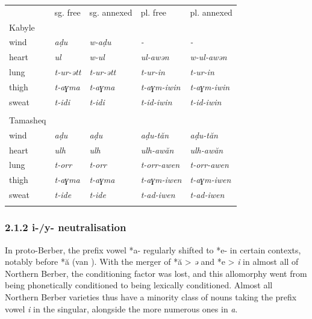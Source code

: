 \documentclass[output=paper]{langscibook}
\begin{document}
\begin{tabularx}{\textwidth}{XXXXX}
 & sg. free & sg. annexed & pl. free & pl. annexed\\
\lsptoprule
Kabyle \citep{Dallet1982} &  &  &  & \\
wind & \textit{aḍu} & \textit{w-aḍu} & \textit{{}-} & \textit{{}-}\\
heart & \textit{ul} & \textit{w-ul} & \textit{ul-awən} & \textit{w-ul-awən}\\
lung & \textit{t-ur-ətt} & \textit{t-ur-ətt} & \textit{t-ur-in} & \textit{t-ur-in}\\
thigh & \textit{t-aɣma} & \textit{t-aɣma} & \textit{t-aɣm-iwin} & \textit{t-aɣm-iwin}\\
sweat & \textit{t-idi} & \textit{t-idi} & \textit{t-id-iwin} & \textit{t-id-iwin}\\
&  &  &  & \\
Tamasheq \citep{Heath2006} &  &  &  & \\
wind & \textit{aḍu} & \textit{aḍu} & \textit{aḍu-tăn} & \textit{aḍu-tăn}\\
heart & \textit{ulh} & \textit{ulh} & \textit{ulh-awăn} & \textit{ulh-awăn}\\
lung & \textit{t-orr} & \textit{t-orr} & \textit{t-orr-awen} & \textit{t-orr-awen}\\
thigh & \textit{t-aɣma} & \textit{t-aɣma} & \textit{t-aɣm-iwen} & \textit{t-aɣm-iwen}\\
sweat & \textit{t-ide} & \textit{t-ide} & \textit{t-ad-iwen} & \textit{t-ad-iwen}\\
\lspbottomrule
\end{tabularx}
\subsubsection{2.1.2 i-/y- neutralisation}
\begin{styleStandarduser}
In proto-Berber, the prefix vowel *a- regularly shifted to *e- in certain contexts, notably before *ă (van \citealt{Putten2016,Putten2018}). With the merger of *ă > \textit{ə} and *e > \textit{i} in almost all of Northern Berber, the conditioning factor was lost, and this allomorphy went from being phonetically conditioned to being lexically conditioned. Almost all Northern Berber varieties thus have a minority class of nouns taking the prefix vowel \textit{i} in the singular, alongside the more numerous ones in \textit{a}.
\end{styleStandarduser}
\end{document}

